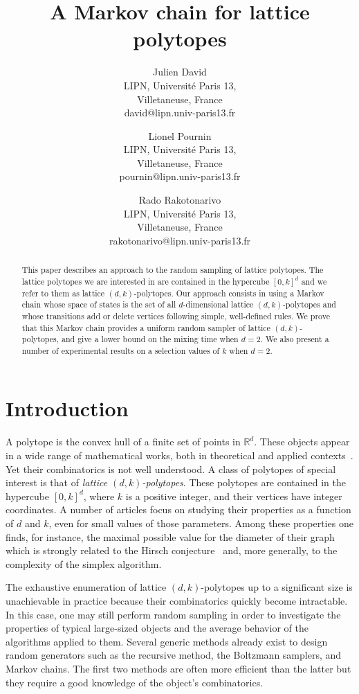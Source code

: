 \documentclass[a4paper]{article}
\title{A Markov chain for lattice polytopes}
\author{
Julien David \\ LIPN, Université Paris 13,\\
               Villetaneuse, France \\ david@lipn.univ-paris13.fr
\and
Lionel Pournin \\ LIPN, Université Paris 13,\\
               Villetaneuse, France \\ pournin@lipn.univ-paris13.fr
\and
Rado Rakotonarivo \\ LIPN, Université Paris 13,\\
               Villetaneuse, France \\ rakotonarivo@lipn.univ-paris13.fr
}
\begin{document}
\maketitle

\begin{abstract}
This paper describes an approach to the random sampling of lattice polytopes. The lattice polytopes we are interested in are contained in the hypercube $[0,k]^d$ and we refer to them as lattice $(d,k)$-polytopes. Our approach consists in using a Markov chain whose space of states is the set of all $d$-dimensional lattice $(d,k)$-polytopes and whose transitions add or delete vertices following simple, well-defined rules. We prove that this Markov chain provides a uniform random sampler of lattice $(d, k)$-polytopes, and give a lower bound on the mixing time when $d=2$. We also present a number of experimental results on a selection values of $k$ when $d=2$.
\end{abstract}
\vskip 32pt

\section{Introduction}

A polytope is the convex hull of a finite set of points in $\mathbb{R}^d$. These objects appear in a wide range of mathematical works, both in theoretical and applied contexts~\cite{ziegler1995lectures}. Yet their combinatorics is not well understood. A class of polytopes of special interest is that of \emph{lattice $(d,k)$-polytopes}. These polytopes are contained in the hypercube $[0,k]^d$, where $k$ is a positive integer, and their vertices have integer coordinates. A number of articles focus on studying their properties as a function of $d$ and $k$, even for small values of those parameters. Among these properties one finds, for instance, the maximal possible value for the diameter of their graph~\cite{DelPiaMichini2016,DezaManoussakisOnn2018,DezaPournin2018,KleinschmidtOnn1992,Naddef1989} which is strongly related to the Hirsch conjecture~\cite{BonifasDiSummaEisenbrandHahnleNiemeier2014,BorgwardtDeLoeraFinhold2016,KalaiKleitman1992,KleeWalkup1967,Santos2012} and, more generally, to the complexity of the simplex algorithm.

The exhaustive enumeration of lattice $(d,k)$-polytopes up to a significant size is unachievable in practice because their combinatorics quickly become intractable. In this case, one may still perform random sampling in order to investigate the properties of typical large-sized objects and the average behavior of the algorithms applied to them. Several generic methods already exist to design random generators such as the recursive method, the Boltzmann samplers, and Markov chains. The first two methods are often more efficient than the latter but they require a good knowledge of the object's combinatorics.
\end{document}

